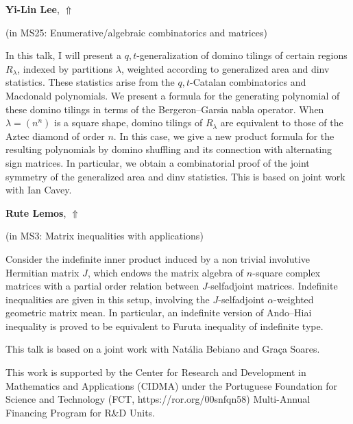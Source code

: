 \documentclass[ILAS2025-program.tex]{subfiles}
\begin{document}
     \hypertarget{down0225}{}\begin{ilasabstract}
    
    \textbf{Yi-Lin Lee},  \hfill \hyperlink{up0225}{$\Uparrow$}
    
    (in {\color{mstitle}MS25: Enumerative/algebraic combinatorics and matrices})
        
        \mtskip
    In this talk, I will present a $q,t$-generalization of domino tilings of certain regions $R_\lambda$, indexed by partitions $\lambda$, weighted according to generalized area and dinv statistics. These statistics arise from the $q,t$-Catalan combinatorics and Macdonald polynomials. We present a formula for the generating polynomial of these domino tilings in terms of the Bergeron--Garsia nabla operator. When $\lambda = (n^n)$ is a square shape, domino tilings of $R_\lambda$ are equivalent to those of the Aztec diamond of order $n$. In this case, we give a new product formula for the resulting polynomials by domino shuffling and its connection with alternating sign matrices. In particular, we obtain a combinatorial proof of the joint symmetry of the generalized area and dinv statistics. This is based on joint work with Ian Cavey.\end{ilasabstract}
     \hypertarget{down0265}{}\begin{ilasabstract}
    
    \textbf{Rute Lemos},  \hfill \hyperlink{up0265}{$\Uparrow$}
    
    (in {\color{mstitle}MS3: Matrix inequalities with applications})
        
        \mtskip
    Consider the indefinite inner product induced by a non trivial involutive Hermitian matrix $J$, 
which endows the matrix algebra of $n$-square complex matrices with a partial order relation between $J$-selfadjoint matrices.
Indefinite inequalities are given in this setup, involving the $J$-selfadjoint $\alpha$-weighted geometric matrix mean. 
In particular, an indefinite version of Ando–Hiai inequality is proved to be equivalent to Furuta inequality of indefinite type.

This talk is based on a joint work with Nat\'alia Bebiano and Gra\c ca Soares.

This work is supported by the
Center for Research and Development in Mathematics and Applications (CIDMA) under the
Portuguese Foundation for Science and Technology 
(FCT, https://ror.org/00snfqn58)   
Multi-Annual Financing Program for R\&D Units.


\end{ilasabstract}
\end{document}
